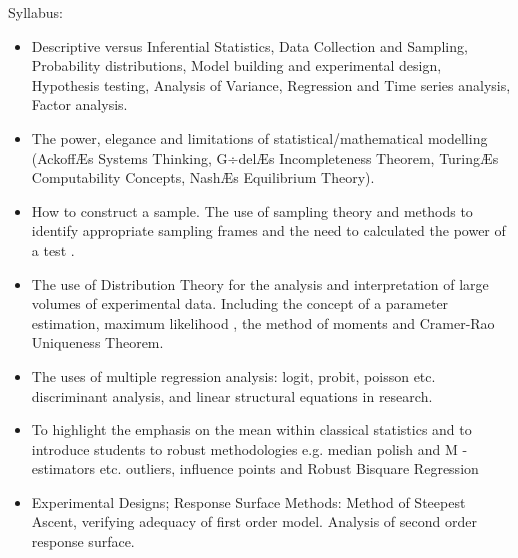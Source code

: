 Syllabus:
\begin{itemize}
\item Descriptive versus Inferential Statistics, Data Collection and Sampling, Probability distributions, Model building and experimental design, Hypothesis testing, Analysis of Variance, Regression and Time series analysis, Factor analysis.
\item The power, elegance and limitations of statistical/mathematical modelling (AckoffÆs Systems Thinking, G÷delÆs Incompleteness Theorem, TuringÆs Computability Concepts, NashÆs Equilibrium Theory).
\item How to construct a sample.  The use of sampling theory and methods to identify appropriate sampling frames and the need to calculated the power of a test .
\item The use of Distribution Theory for the analysis and interpretation of large volumes of experimental data.  Including the concept of a parameter estimation, maximum likelihood , the method of moments and Cramer-Rao Uniqueness Theorem.     
\item The uses of multiple regression analysis: logit, probit, poisson etc. discriminant analysis, and linear structural equations in research.  

\item To highlight the emphasis on the mean within classical statistics and to introduce students to robust methodologies e.g. median polish and M - estimators etc. outliers, influence points and Robust Bisquare Regression
\item Experimental Designs; Response Surface Methods: Method of Steepest Ascent, verifying adequacy of first order model. Analysis of second order response surface.
\end{itemize}

